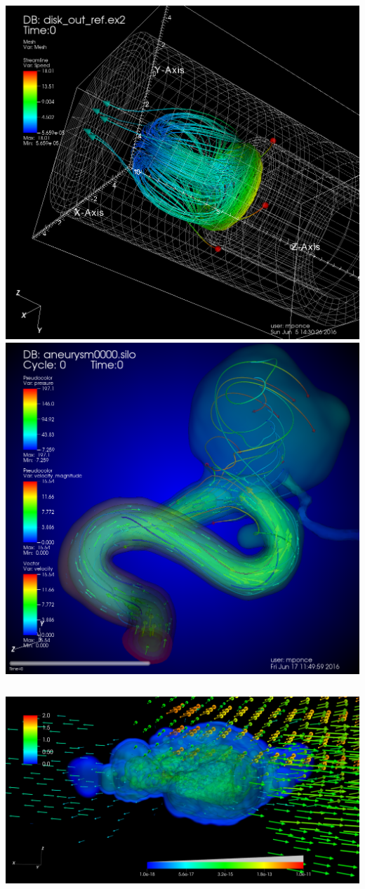 \begin{frame}
\vspace{-8.5mm}
\begin{columns}
\begin{column}{13cm}
        \includegraphics[width=.5\columnwidth]{figs/visit-handson/disk_out_ref-streamlines}
        \includegraphics[width=.5\columnwidth]{figs/visit-pract/VisIt_aneurysm0}
\end{column}
\end{columns}
\vspace{-1mm}
\begin{columns}
\begin{column}{13cm}
	 \href{http://arxiv.org/abs/1601.07942}{\includegraphics[width=\columnwidth, clip,trim=2cm 1cm 0 8cm]{figs/plots/mpc/4k_sph_0005}}
\end{column}
\end{columns}
\end{frame}


